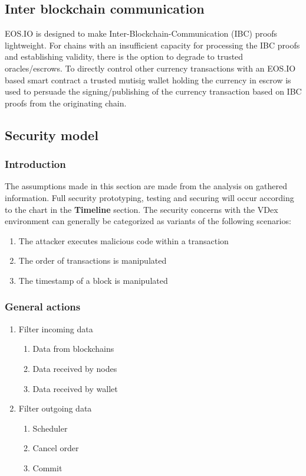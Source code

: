 \documentclass[]{article}
\begin{document}
\subsection{Inter blockchain communication}
EOS.IO is designed to make Inter-Blockchain-Communication (IBC) proofs lightweight. 
For chains with an insufficient capacity for processing the  IBC proofs and establishing validity, 
there is the option to degrade to trusted oracles/escrows.
To directly control other currency transactions with an
EOS.IO based smart contract a trusted mutisig wallet holding the currency 
in escrow is used to persuade the signing/publishing of the currency 
transaction based on IBC proofs from the originating chain.	
\subsection{Security model}
\subsubsection{Introduction}
The assumptions made in this section are made from the analysis on gathered information.
Full security prototyping, testing and securing will occur according to the chart in the \textbf{Timeline} section. 
The security concerns with the VDex environment can generally be categorized as variants of the following scenarios:
	\begin{enumerate}
		\item The attacker executes malicious code within a transaction
		\item The order of transactions is manipulated
		\item The timestamp of a block is manipulated
	\end{enumerate}
	\subsubsection{General actions}
		\begin{enumerate}	
		\item{Filter incoming data} 
		\begin{enumerate}
			\item Data from blockchains
			\item Data received by nodes
			\item Data received by wallet
		\end{enumerate}
		\item {Filter outgoing data}
		\begin{enumerate}
			\item Scheduler
			\item Cancel order
			\item Commit
		\end{enumerate}
	\end{enumerate}
\end{document}
